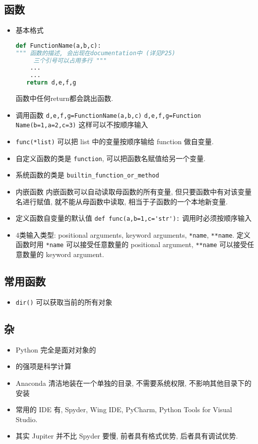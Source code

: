 \subsection{函数}

\begin{itemize}
\item 基本格式
\begin{lstlisting}[language=python]
def FunctionName(a,b,c):
""" 函数的描述, 会出现在documentation中 (详见P25)
     三个引号可以占用多行 """
    ...
    ...
   return d,e,f,g
\end{lstlisting}

函数中任何return都会跳出函数.

\item 调用函数
\verb`d,e,f,g=FunctionName(a,b,c)`
\verb`d,e,f,g=Function Name(b=1,a=2,c=3)`  这样可以不按顺序输入
\item \verb`func(*list)` 可以把 list 中的变量按顺序输给 function 做自变量.

\item 自定义函数的类是 \verb`function`, 可以把函数名赋值给另一个变量.
\item 系统函数的类是 \verb`builtin_function_or_method`

\item 内嵌函数
内嵌函数可以自动读取母函数的所有变量, 但只要函数中有对该变量名进行赋值, 就不能从母函数中读取, 相当于子函数的一个本地新变量.

\item 定义函数自变量的默认值  \verb`def func(a,b=1,c='str'):` 调用时必须按顺序输入
\item 4类输入类型: positional arguments, keyword arguments, \verb`*name`, \verb`**name`. 定义函数时用 \verb`*name` 可以接受任意数量的 positional argument, \verb`**name` 可以接受任意数量的 keyword argument.
\end{itemize}

\subsection{常用函数}
\begin{itemize}
\item \verb`dir()` 可以获取当前的所有对象
\end{itemize}

\subsection{杂}
\begin{itemize}
\item Python 完全是面对对象的
\item {} 的强项是科学计算
\item Anaconda 清洁地装在一个单独的目录, 不需要系统权限, 不影响其他目录下的安装
\item 常用的 IDE 有, Spyder, Wing IDE, PyCharm, Python Tools for Visual Studio.
\item 其实 Jupiter 并不比 Spyder 要慢, 前者具有格式优势, 后者具有调试优势.
\end{itemize}
